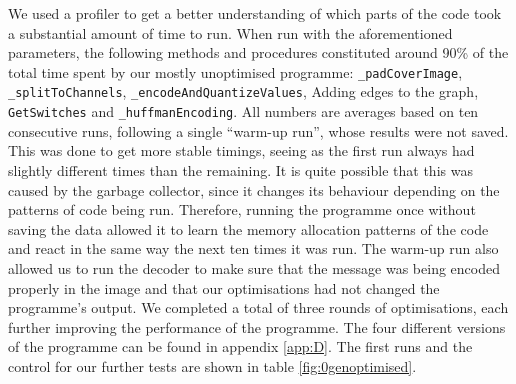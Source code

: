 We used a profiler to get a better understanding of which parts of the code took a substantial amount of time to run.
When run with the aforementioned parameters, the following methods and procedures constituted around 90\% of the total time spent by our mostly unoptimised programme:
\lstinline|_padCoverImage|, \lstinline|_splitToChannels|, \lstinline|_encodeAndQuantizeValues|, Adding edges to the graph, \lstinline|GetSwitches| and \lstinline|_huffmanEncoding|.
All numbers are averages based on ten consecutive runs, following a single ``warm-up run'', whose results were not saved.
This was done to get more stable timings, seeing as the first run always had slightly different times than the remaining.
It is quite possible that this was caused by the garbage collector, since it changes its behaviour depending on the patterns of code being run.
Therefore, running the programme once without saving the data allowed it to learn the memory allocation patterns of the code and react in the same way the next ten times it was run.
The warm-up run also allowed us to run the decoder to make sure that the message was being encoded properly in the image and that our optimisations had not changed the programme's output.
We completed a total of three rounds of optimisations, each further improving the performance of the programme.
The four different versions of the programme can be found in appendix \ref{app:D}.
The first runs and the control for our further tests are shown in table \ref{fig:0genoptimised}.

